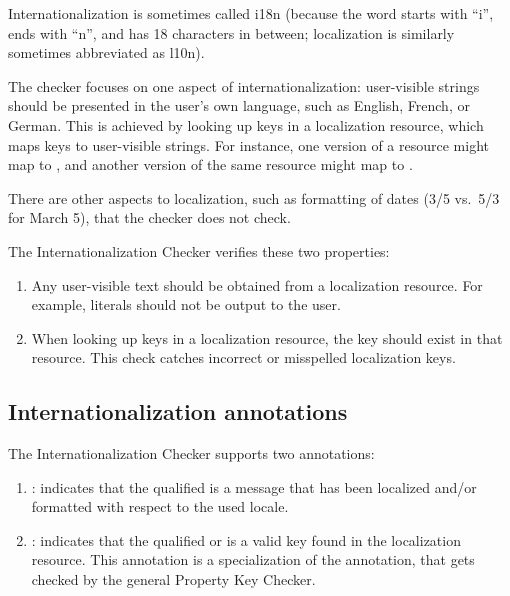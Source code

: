 Internationalization is sometimes called i18n (because the word starts with ``i'',
ends with ``n'', and has 18 characters in between; localization is similarly
sometimes abbreviated as l10n).

The checker focuses on one aspect of internationalization:  user-visible strings
should be presented in the user's own language, such as English, French, or
German.  This is achieved by looking up keys in a localization resource,
which maps keys to user-visible strings.  For instance, one version of a
resource might map  to
, and another version of the same resource might map
 to .

There are other aspects to localization, such as formatting of dates (3/5
vs.~5/3 for March 5), that the checker does not check.

The Internationalization Checker verifies these two properties:

\begin{enumerate}

\item
  Any user-visible text should be obtained from a localization resource.
  For example,  literals should not be output to the user.

\item
  When looking up keys in a localization resource, the key should exist in
  that resource.  This check catches incorrect or misspelled localization
  keys.

\end{enumerate}


\subsection{Internationalization annotations\label{i18n-annotations}}

The Internationalization Checker supports two annotations:

\begin{enumerate}
\item {}: indicates that the qualified
 is a message that has been localized and/or formatted with
respect to the used locale.

\item {}: indicates that the
qualified  or  is a valid key found in the
localization resource.
This annotation is a specialization of the  annotation, that
gets checked by the general Property Key Checker.
\end{enumerate}

